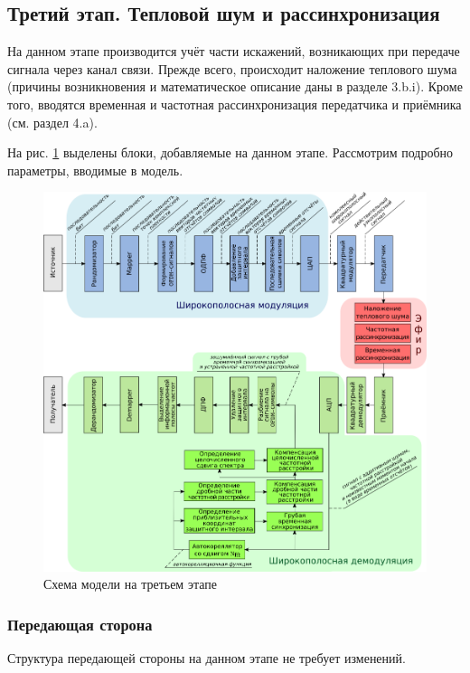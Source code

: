 \subsection{Третий этап. Тепловой шум и рассинхронизация}

На данном этапе производится учёт части искажений, возникающих при передаче сигнала через канал связи. Прежде всего, происходит наложение теплового шума (причины возникновения и математическое описание даны в разделе 3.b.i). Кроме того, вводятся временная и частотная рассинхронизация передатчика и приёмника (см. раздел 4.a). 

На рис. \ref{fg:schem3} выделены блоки, добавляемые на данном этапе. Рассмотрим подробно параметры, вводимые в модель.

\begin{figure}[h!]
\centering
\includegraphics[width=1\textwidth]{OFDM-3.png}
\caption{Схема модели на третьем этапе} \label{fg:schem3}
\end{figure}

\subsubsection{Передающая сторона}
Структура передающей стороны на данном этапе не требует изменений.

